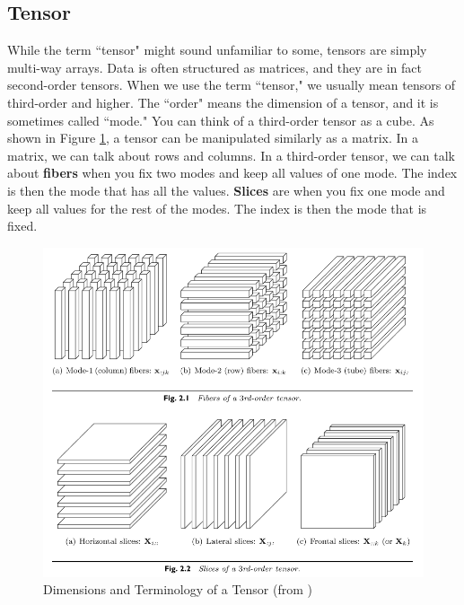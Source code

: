 \documentclass[11pt]{article}
\begin{document}
\subsection{Tensor}

While the term ``tensor" might sound unfamiliar to some, tensors are simply multi-way arrays. Data is often structured as matrices, and they are in fact second-order tensors. When we use the term ``tensor," we usually mean tensors of third-order and higher. The ``order" means the dimension of a tensor, and it is sometimes called ``mode." You can think of a third-order tensor as a cube. As shown in Figure \ref{fig:tensor}, a tensor can be manipulated similarly as a matrix. In a matrix, we can talk about rows and columns. In a third-order tensor, we can talk about \textbf{fibers} when you fix two modes and keep all values of one mode. The index is then the mode that has all the values. \textbf{Slices} are when you fix one mode and keep all values for the rest of the modes. The index is then the mode that is fixed.

\begin{figure}[H]
    \centering
    \includegraphics[width = 10 cm]{tensor.png}
    \caption{Dimensions and Terminology of a Tensor (from \cite{kolda2009review})}
    \label{fig:tensor}
\end{figure}
\end{document}
